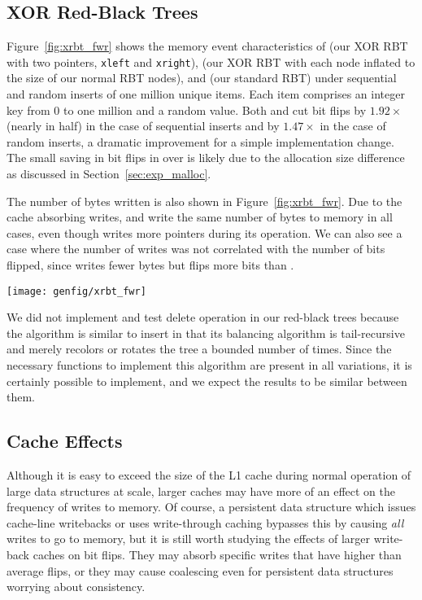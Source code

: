 \subsection{XOR Red-Black Trees}
Figure~\ref{fig:xrbt_fwr} shows the memory event characteristics of \xrbt (our XOR RBT with two
pointers, \texttt{xleft} and \texttt{xright}),
\xrbtbig (our XOR RBT with each node inflated to the size of our normal RBT nodes), and \rbt (our
standard RBT) under sequential and random inserts of one million unique items. Each item
comprises an integer key from 0 to one million and a random value.
Both \xrbt and \xrbtbig cut bit flips by $1.92\times$ (nearly in half)
in the case of sequential
inserts and by $1.47\times$ in the case of random inserts, a dramatic improvement for
a simple implementation change. The small saving in bit flips in \xrbtbig over
\xrbt is likely due to the allocation size difference as discussed in
Section~\ref{sec:exp_malloc}.

The number of bytes written is also shown in Figure~\ref{fig:xrbt_fwr}. Due to
the cache absorbing writes, \xrbtbig and \rbt write the same number of bytes to
memory in all cases, even though \rbt writes more pointers during its operation.
We can also see a case where the number of writes was not correlated with the
number of bits flipped, since \xrbt writes fewer bytes but flips more bits than
\xrbtbig.

\begin{SCfigure}
	\centering
	\texttt{[image: genfig/xrbt\_fwr]}
	\caption{Memory characteristics of XOR red-black trees compared to normal
		red-black trees.}
	\label{fig:xrbt_fwr}
\end{SCfigure}

We did not implement and test delete operation in our red-black trees because
the algorithm is similar to insert in that its balancing algorithm is
tail-recursive and merely recolors or rotates the tree a bounded number of times.
Since the necessary functions to implement this algorithm are present in all
variations, it is certainly possible to implement, and we expect the results to be similar
between them.

\subsection{Cache Effects}
\label{sec:exp_cache}

Although it is easy to exceed the size of the L1 cache during normal operation
of large data structures at scale, larger caches may have more of an effect on
the frequency of writes to memory. Of course, a persistent data structure which
issues cache-line writebacks or uses write-through caching bypasses this by
causing \textit{all} writes to go to memory, but it is still worth studying the effects of larger write-back
caches on bit flips. They may absorb specific writes that have higher
than average flips, or they may cause coalescing even for persistent data
structures worrying about consistency.

